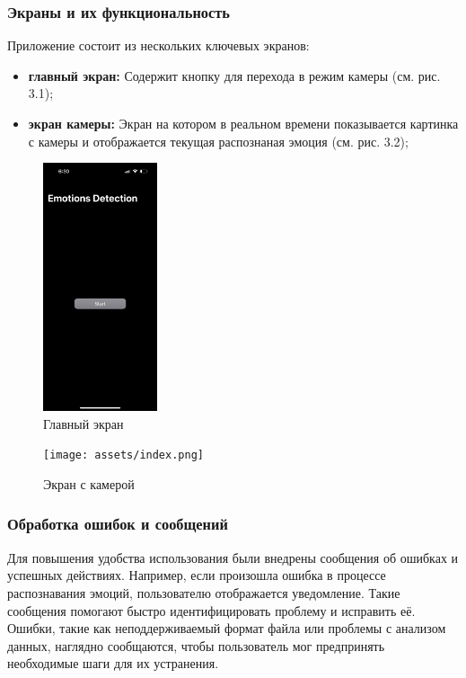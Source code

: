 {{    \subsubsection*{Экраны и их функциональность}
    
    Приложение состоит из нескольких ключевых экранов:
    
    \begin{itemize}
        \item \textbf{главный экран:} Содержит кнопку для перехода в режим камеры (см. рис. 3.1);
        \item \textbf{экран камеры:} Экран на котором в реальном времени показывается картинка с камеры и отображается текущая распознаная эмоция (см. рис. 3.2);
    \end{itemize}
    \begin{figure}[H]
        \centering
        \includegraphics[width=0.3\textwidth]{assets/registration.png} 
        \caption{Главный экран}
    \end{figure}
    \begin{figure}[H]
        \centering
        \texttt{[image: assets/index.png]} 
        \caption{Экран с камерой}
    \end{figure}
    
    \subsubsection*{Обработка ошибок и сообщений}
    
    Для повышения удобства использования были внедрены сообщения об ошибках и успешных действиях. Например, если произошла ошибка в процессе распознавания эмоций, пользователю отображается уведомление. Такие сообщения помогают быстро идентифицировать проблему и исправить её. Ошибки, такие как неподдерживаемый формат файла или проблемы с анализом данных, наглядно сообщаются, чтобы пользователь мог предпринять необходимые шаги для их устранения.
    
}}
